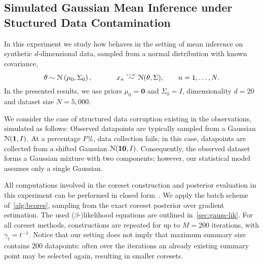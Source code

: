 \subsection{Simulated Gaussian Mean Inference under Stuctured Data Contamination}
\label{subsec:gauss-expt}

In this experiment we study how \bcores{} behaves in the setting of mean inference on synthetic $d$-dimensional data, sampled \iid from a normal distribution with known covariance,
\[
\theta \sim \distNorm\left(\mu_0, \Sigma_0\right),
\qquad 
\;\;\;\;\;
x_n \distiid \distNorm(\theta, \Sigma),
\qquad
n = 1, \ldots, N.
\label{eq:mvn-expt}
\]
In the presented results, we use priors $\mu_0=\mathbf{0}$ and $\Sigma_0=I$,  dimensionality $d=20$ and dataset size $N=5,000$.
 
We consider the case of structured data corruption existing in the observations, simulated as follows: Observed datapoints are typically sampled from a Gaussian $ \mathcal{N}(\mathbf{1}, I)$. At a percentage $F\%$,  data collection fails; in this case, datapoints are collected from a shifted Gaussian $ \mathcal{N}(\mathbf{10}, I)$. Consequently, the observed dataset forms a Gaussian mixture with two components; however, our statistical model assumes only a single Gaussian.

All computations involved in the coreset construction and posterior evaluation in this experiment can be performed in closed form~\cite{campbell19neurips}. We apply the batch scheme of~\cref{alg:bcores}, sampling from the exact coreset posterior over gradient estimation. The used \mbox{($\beta$-)}likelihood equations are outlined in~\cref{sec:gauss-lik}. For all coreset methods, constructions are repeated for up to $M=200$ iterations, with $\gamma_t = t^{-1}$. Notice that our setting does not imply that maximum summary size contains 200 datapoints: often over the iterations an already existing summary point may be selected again, resulting in smaller coresets.


